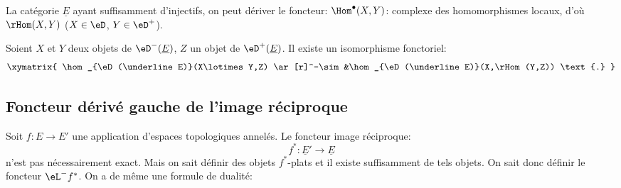 La catégorie $\underline E$ ayant suffisamment d'injectifs, on peut 
dériver le foncteur: $\Hom^\bullet(X,Y)$: complexe des homomorphismes locaux,  
d'où $\rHom(X,Y)$ ($X\in \eD$, $Y\in \eD^+$). 

Soient $X$ et $Y$ deux objets de $\eD^-(\underline E)$, $Z$ un objet de 
$\eD^+(\underline E)$. Il existe un isomorphisme fonctoriel: 
\[\xymatrix{
  \hom_{\eD(\underline E)}(X\lotimes Y,Z) \ar[r]^-\sim 
    &\hom_{\eD(\underline E)}(X,\rHom(Y,Z)) \text{.}
}\]










\subsection{Foncteur dérivé gauche de l'image réciproque}\label{VIII:6-3}

Soit $f:E\to E'$ une application d'espaces topologiques annelés. Le 
foncteur image réciproque: 
\[
  f^\ast:\underline{E}' \to \underline E 
\]
n'est pas nécessairement exact. Mais on sait définir des objets 
$f^\ast$-plats et il existe suffisamment de tels objets. On sait donc 
définir le foncteur $\eL^- f^\ast$. On a de même une formule de dualité: 

















